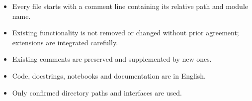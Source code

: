 
\begin{itemize}
  \item Every file starts with a comment line containing its relative
        path and module name.
  \item Existing functionality is not removed or changed without prior
        agreement; extensions are integrated carefully.
  \item Existing comments are preserved and supplemented by new ones.
  \item Code, docstrings, notebooks and documentation are in English.
  \item Only confirmed directory paths and interfaces are used.
\end{itemize}

